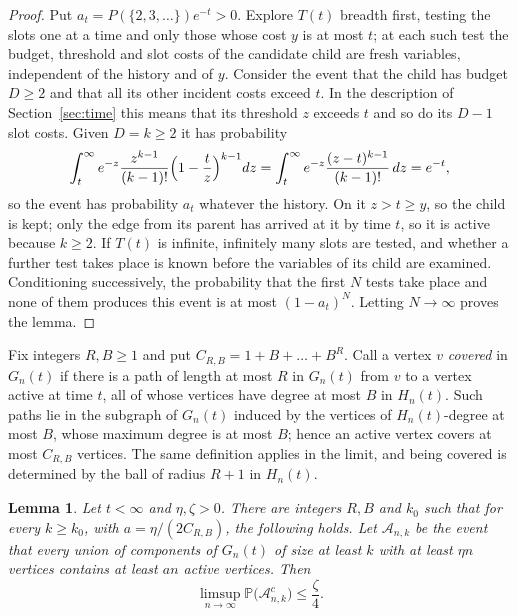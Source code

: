 \documentclass[11pt]{amsart}
\newtheorem{lemma}[theorem]{Lemma}
\theoremstyle{remark}
\numberwithin{equation}{section}
\newcommand{\Pp}{\mathbb P}
\newcommand{\1}{\mathbf 1}
\begin{document}
\begin{proof}
Put $a_t=P(\{2,3,\dots\})e^{-t}>0$. Explore $T(t)$ breadth first, testing the slots one at a time and only those whose cost $y$ is at most $t$; at each such test the budget, threshold and slot costs of the candidate child are fresh variables, independent of the history and of $y$. Consider the event that the child has budget $D\ge2$ and that all its other incident costs exceed $t$. In the description of Section~\ref{sec:time} this means that its threshold $z$ exceeds $t$ and so do its $D-1$ slot costs. Given $D=k\ge2$ it has probability
\[
\int_t^\infty e^{-z}\frac{z^{k-1}}{(k-1)!}\Bigl(1-\frac tz\Bigr)^{k-1}dz=\int_t^\infty e^{-z}\frac{(z-t)^{k-1}}{(k-1)!}\,dz=e^{-t},
\]
so the event has probability $a_t$ whatever the history. On it $z>t\ge y$, so the child is kept; only the edge from its parent has arrived at it by time $t$, so it is active because $k\ge2$. If $T(t)$ is infinite, infinitely many slots are tested, and whether a further test takes place is known before the variables of its child are examined. Conditioning successively, the probability that the first $N$ tests take place and none of them produces this event is at most $(1-a_t)^N$. Letting $N\to\infty$ proves the lemma.
\end{proof}

Fix integers $R,B\ge1$ and put $C_{R,B}=1+B+\dots+B^R$. Call a vertex $v$ \emph{covered} in $G_n(t)$ if there is a path of length at most $R$ in $G_n(t)$ from $v$ to a vertex active at time $t$, all of whose vertices have degree at most $B$ in $H_n(t)$. Such paths lie in the subgraph of $G_n(t)$ induced by the vertices of $H_n(t)$-degree at most $B$, whose maximum degree is at most $B$; hence an active vertex covers at most $C_{R,B}$ vertices. The same definition applies in the limit, and being covered is determined by the ball of radius $R+1$ in $H_n(t)$.

\begin{lemma}\label{lem:cover}
Let $t<\infty$ and $\eta,\zeta>0$. There are integers $R,B$ and $k_0$ such that for every $k\ge k_0$, with $a=\eta/(2C_{R,B})$, the following holds. Let $\mathcal A_{n,k}$ be the event that every union of components of $G_n(t)$ of size at least $k$ with at least $\eta n$ vertices contains at least $an$ active vertices. Then
\[
\limsup_{n\to\infty}\Pp\bigl(\mathcal A_{n,k}^c\bigr)\le\frac\zeta4 .
\]
\end{lemma}
\end{document}
